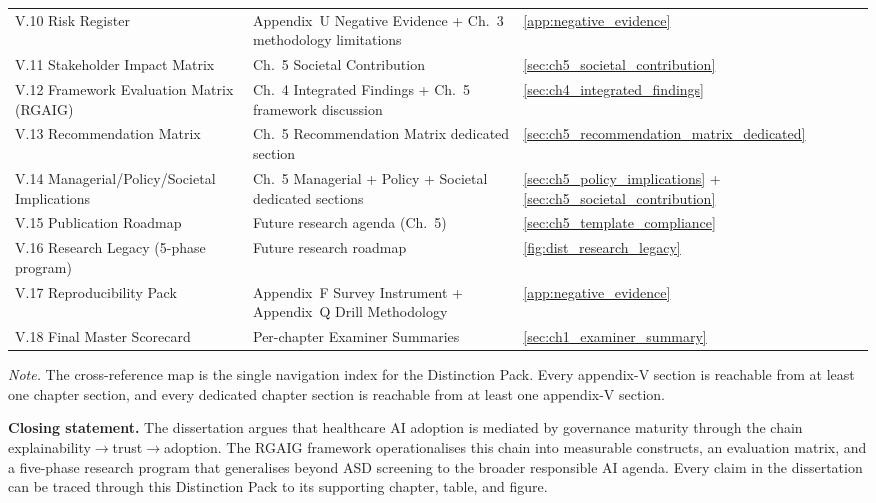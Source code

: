 {\begin{xltabular}{\textwidth}{@{} >{\raggedright\arraybackslash}p{4.0cm} >{\raggedright\arraybackslash}p{4.5cm} L @{}}
\addlinespace
V.10 Risk Register & Appendix~U Negative Evidence + Ch.~3 methodology limitations & \autoref{app:negative_evidence} \\
\addlinespace
V.11 Stakeholder Impact Matrix & Ch.~5 Societal Contribution & \autoref{sec:ch5_societal_contribution} \\
\addlinespace
V.12 Framework Evaluation Matrix (RGAIG) & Ch.~4 Integrated Findings + Ch.~5 framework discussion & \autoref{sec:ch4_integrated_findings} \\
\addlinespace
V.13 Recommendation Matrix & Ch.~5 Recommendation Matrix dedicated section & \autoref{sec:ch5_recommendation_matrix_dedicated} \\
\addlinespace
V.14 Managerial/Policy/Societal Implications & Ch.~5 Managerial + Policy + Societal dedicated sections & \autoref{sec:ch5_policy_implications} + \autoref{sec:ch5_societal_contribution} \\
\addlinespace
V.15 Publication Roadmap & Future research agenda (Ch.~5) & \autoref{sec:ch5_template_compliance} \\
\addlinespace
V.16 Research Legacy (5-phase program) & Future research roadmap & \autoref{fig:dist_research_legacy} \\
\addlinespace
V.17 Reproducibility Pack & Appendix~F Survey Instrument + Appendix~Q Drill Methodology & \autoref{app:negative_evidence} \\
\addlinespace
V.18 Final Master Scorecard & Per-chapter Examiner Summaries & \autoref{sec:ch1_examiner_summary} \\
\end{xltabular}}

\vspace{0.3em}\noindent\textit{Note.} The cross-reference map is the single navigation index for the Distinction Pack. Every appendix-V section is reachable from at least one chapter section, and every dedicated chapter section is reachable from at least one appendix-V section.

\vspace{0.5em}\noindent\textbf{Closing statement.} The dissertation argues that healthcare AI adoption is mediated by governance maturity through the chain explainability$\rightarrow$trust$\rightarrow$adoption. The RGAIG framework operationalises this chain into measurable constructs, an evaluation matrix, and a five-phase research program that generalises beyond ASD screening to the broader responsible AI agenda. Every claim in the dissertation can be traced through this Distinction Pack to its supporting chapter, table, and figure.
